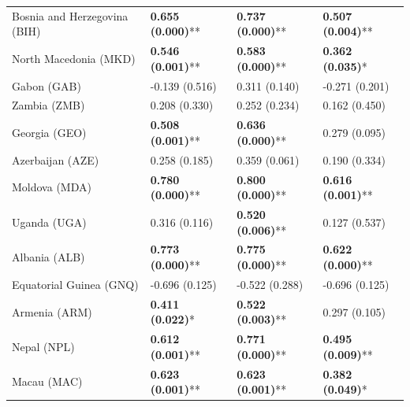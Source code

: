 \begin{longtable}{p{5cm}p{3cm}p{3cm}p{5cm}}
Bosnia and Herzegovina (BIH) & \textcolor{atlLime600}{\textbf{0.655 (0.000)}**} & \textcolor{atlLime600}{\textbf{0.737 (0.000)}**} & \textcolor{atlLime600}{\textbf{0.507 (0.004)}**} \\
North Macedonia (MKD) & \textcolor{atlLime600}{\textbf{0.546 (0.001)}**} & \textcolor{atlLime600}{\textbf{0.583 (0.000)}**} & \textcolor{atlLime600}{\textbf{0.362 (0.035)}*} \\
Gabon (GAB) & \textcolor{atlOrange600}{-0.139 (0.516)} & \textcolor{atlOrange600}{0.311 (0.140)} & \textcolor{atlOrange600}{-0.271 (0.201)} \\
Zambia (ZMB) & \textcolor{atlOrange600}{0.208 (0.330)} & \textcolor{atlOrange600}{0.252 (0.234)} & \textcolor{atlOrange600}{0.162 (0.450)} \\
Georgia (GEO) & \textcolor{atlLime600}{\textbf{0.508 (0.001)}**} & \textcolor{atlLime600}{\textbf{0.636 (0.000)}**} & \textcolor{atlOrange600}{0.279 (0.095)} \\
Azerbaijan (AZE) & \textcolor{atlOrange600}{0.258 (0.185)} & \textcolor{atlOrange600}{0.359 (0.061)} & \textcolor{atlOrange600}{0.190 (0.334)} \\
Moldova (MDA) & \textcolor{atlLime600}{\textbf{0.780 (0.000)}**} & \textcolor{atlLime600}{\textbf{0.800 (0.000)}**} & \textcolor{atlLime600}{\textbf{0.616 (0.001)}**} \\
Uganda (UGA) & \textcolor{atlOrange600}{0.316 (0.116)} & \textcolor{atlLime600}{\textbf{0.520 (0.006)}**} & \textcolor{atlOrange600}{0.127 (0.537)} \\
Albania (ALB) & \textcolor{atlLime600}{\textbf{0.773 (0.000)}**} & \textcolor{atlLime600}{\textbf{0.775 (0.000)}**} & \textcolor{atlLime600}{\textbf{0.622 (0.000)}**} \\
Equatorial Guinea (GNQ) & \textcolor{atlOrange600}{-0.696 (0.125)} & \textcolor{atlOrange600}{-0.522 (0.288)} & \textcolor{atlOrange600}{-0.696 (0.125)} \\
Armenia (ARM) & \textcolor{atlLime600}{\textbf{0.411 (0.022)}*} & \textcolor{atlLime600}{\textbf{0.522 (0.003)}**} & \textcolor{atlOrange600}{0.297 (0.105)} \\
Nepal (NPL) & \textcolor{atlLime600}{\textbf{0.612 (0.001)}**} & \textcolor{atlLime600}{\textbf{0.771 (0.000)}**} & \textcolor{atlLime600}{\textbf{0.495 (0.009)}**} \\
Macau (MAC) & \textcolor{atlLime600}{\textbf{0.623 (0.001)}**} & \textcolor{atlLime600}{\textbf{0.623 (0.001)}**} & \textcolor{atlLime600}{\textbf{0.382 (0.049)}*} \\

\end{longtable}
